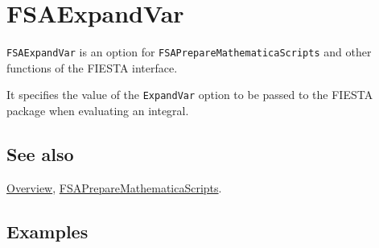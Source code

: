 \documentclass[../FeynHelpersManual.tex]{subfiles}
\begin{document}
\hypertarget{fsaexpandvar}{
\section{FSAExpandVar}\label{fsaexpandvar}}

\texttt{FSAExpandVar} is an option for
\texttt{FSAPrepareMathematicaScripts} and other functions of the FIESTA
interface.

It specifies the value of the \texttt{ExpandVar} option to be passed to
the FIESTA package when evaluating an integral.

\subsection{See also}

\hyperlink{toc}{Overview},
\hyperlink{fsapreparemathematicascripts}{FSAPrepareMathematicaScripts}.

\subsection{Examples}
\end{document}
